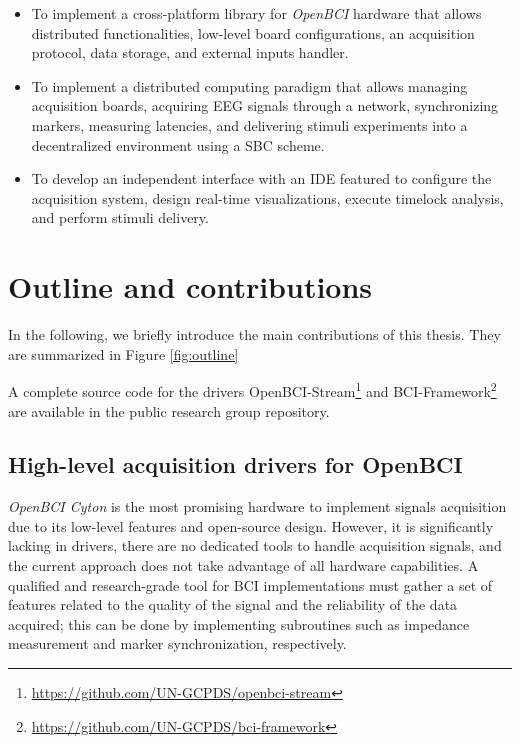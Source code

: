     \begin{itemize}

        \item To implement a cross-platform library for \textit{OpenBCI} hardware that allows distributed functionalities, low-level board configurations, an acquisition protocol, data storage, and external inputs handler. %
        
        \item To implement a distributed computing paradigm that allows managing acquisition boards, acquiring \gls*{EEG} signals through a network, synchronizing markers, measuring latencies, and delivering stimuli experiments into a decentralized environment using a \gls*{SBC} scheme.

        \item To develop an independent interface with an \gls*{IDE} featured to configure the acquisition system, design real-time visualizations, execute timelock analysis, and perform stimuli delivery. 


    \end{itemize}

\section{Outline and contributions}

{\color {Nessa}
In the following, we briefly introduce the main contributions of this thesis. They are summarized in Figure \ref{fig:outline}



A complete source code for the drivers OpenBCI-Stream\footnote{\href{https://github.com/UN-GCPDS/openbci-stream}{https://github.com/UN-GCPDS/openbci-stream}} and BCI-Framework\footnote{\href{https://github.com/UN-GCPDS/bci-framework}{https://github.com/UN-GCPDS/bci-framework}} are available in the public research group repository.
}

\subsection{High-level acquisition drivers for OpenBCI}

\textit{OpenBCI Cyton} is the most promising hardware to implement signals acquisition due to its low-level features and open-source design. However, it is significantly lacking in drivers, there are no dedicated tools to handle acquisition signals, and the current approach does not take advantage of all hardware capabilities. A qualified and research-grade tool for \gls*{BCI} implementations must gather a set of features related to the quality of the signal and the reliability of the data acquired; this can be done by implementing subroutines such as impedance measurement and marker synchronization, respectively.

